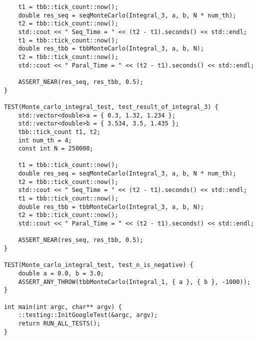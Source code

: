 \documentclass{report}
\begin{document}
\begin{lstlisting}
    t1 = tbb::tick_count::now();
    double res_seq = seqMonteCarlo(Integral_3, a, b, N * num_th);
    t2 = tbb::tick_count::now();
    std::cout << " Seq_Time = " << (t2 - t1).seconds() << std::endl;
    t1 = tbb::tick_count::now();
    double res_tbb = tbbMonteCarlo(Integral_3, a, b, N);
    t2 = tbb::tick_count::now();
    std::cout << " Paral_Time = " << (t2 - t1).seconds() << std::endl;

    ASSERT_NEAR(res_seq, res_tbb, 0.5);
}

TEST(Monte_carlo_integral_test, test_result_of_integral_3) {
    std::vector<double>a = { 0.3, 1.32, 1.234 };
    std::vector<double>b = { 3.534, 3.5, 1.435 };
    tbb::tick_count t1, t2;
    int num_th = 4;
    const int N = 250000;

    t1 = tbb::tick_count::now();
    double res_seq = seqMonteCarlo(Integral_3, a, b, N * num_th);
    t2 = tbb::tick_count::now();
    std::cout << " Seq_Time = " << (t2 - t1).seconds() << std::endl;
    t1 = tbb::tick_count::now();
    double res_tbb = tbbMonteCarlo(Integral_3, a, b, N);
    t2 = tbb::tick_count::now();
    std::cout << " Paral_Time = " << (t2 - t1).seconds() << std::endl;

    ASSERT_NEAR(res_seq, res_tbb, 0.5);
}

TEST(Monte_carlo_integral_test, test_n_is_negative) {
    double a = 0.0, b = 3.0;
    ASSERT_ANY_THROW(tbbMonteCarlo(Integral_1, { a }, { b }, -1000));
}

int main(int argc, char** argv) {
    ::testing::InitGoogleTest(&argc, argv);
    return RUN_ALL_TESTS();
}
\end{lstlisting}
\end{document}
